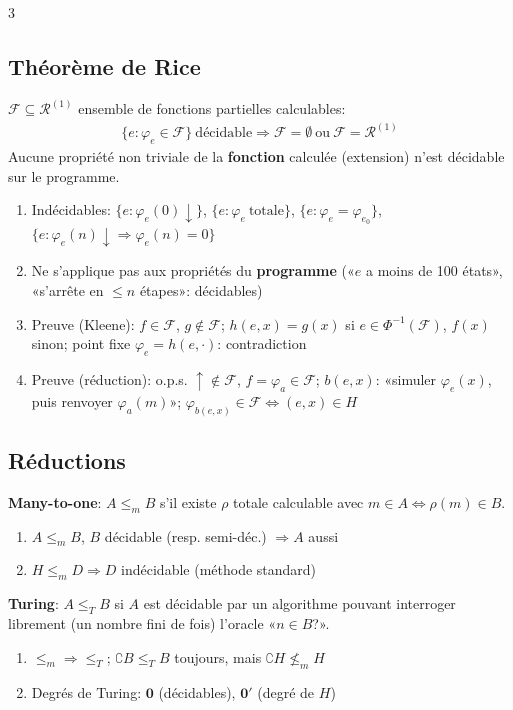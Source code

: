 \documentclass[12pt, a4paper]{article}
\newcommand{\dv}{{\downarrow}}
\newcommand{\uv}{{\uparrow}}
\newcommand{\ff}{\varphi}
\begin{document}
\begin{multicols*}{3}
	\subsection{Théorème de Rice}
	$\mathcal F\subseteq\mathcal R^{(1)}$ ensemble de fonctions partielles calculables:
	\begin{gather*}
		\{e:\ff_e\in\mathcal F\}\ \text{décidable}\Rightarrow\mathcal F=\emptyset\ \text{ou}\ \mathcal F=\mathcal R^{(1)}
	\end{gather*}
	Aucune propriété non triviale de la \textbf{fonction} calculée (extension) n'est décidable sur le programme.
	\begin{enumerate}[\roman*.]
		\item Indécidables: $\{e:\ff_e(0)\dv\}$, $\{e:\ff_e\ \text{totale}\}$, $\{e:\ff_e=\ff_{e_0}\}$, $\{e:\ff_e(n)\dv\Rightarrow\ff_e(n)=0\}$
		\item Ne s'applique pas aux propriétés du \textbf{programme} («$e$ a moins de 100 états», «s'arrête en $\leq n$ étapes»: décidables)
		\item Preuve (Kleene): $f\in\mathcal F$, $g\notin\mathcal F$; $h(e,x)=g(x)$ si $e\in\Phi^{-1}(\mathcal F)$, $f(x)$ sinon; point fixe $\ff_e=h(e,\cdot)$: contradiction
		\item Preuve (réduction): o.p.s. $\uv\notin\mathcal F$, $f=\ff_a\in\mathcal F$; $b(e,x)$: «simuler $\ff_e(x)$, puis renvoyer $\ff_a(m)$»; $\ff_{b(e,x)}\in\mathcal F\iff(e,x)\in H$
	\end{enumerate}

	\colbreak
	\subsection{Réductions}
	\textbf{Many-to-one}: $A\leq_mB$ s'il existe $\rho$ totale calculable avec $m\in A\iff\rho(m)\in B$.
	\begin{enumerate}[\roman*.]
		\item $A\leq_mB$, $B$ décidable (resp. semi-déc.) $\Rightarrow A$ aussi
		\item $H\leq_mD\Rightarrow D$ indécidable (méthode standard)
	\end{enumerate}
	\textbf{Turing}: $A\leq_TB$ si $A$ est décidable par un algorithme pouvant interroger librement (un nombre fini de fois) l'oracle «$n\in B$?».
	\begin{enumerate}[\roman*.]
		\item $\leq_m\Rightarrow\leq_T$; $\complement B\leq_TB$ toujours, mais $\complement H\not\leq_mH$
		\item Degrés de Turing: $\mathbf0$ (décidables), $\mathbf0'$ (degré de $H$)
	\end{enumerate}


\end{multicols*}
\end{document}
